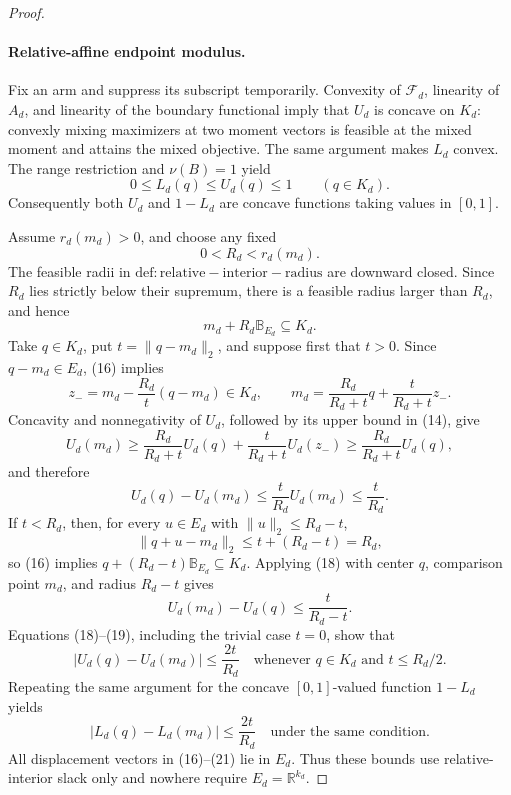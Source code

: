 \documentclass{article}
\begin{document}
\begin{proof}
\paragraph{Relative-affine endpoint modulus.}
Fix an arm and suppress its subscript temporarily.  Convexity of \(\mathcal F_d\), linearity of \(A_d\), and linearity of the boundary functional imply that \(U_d\) is concave on \(K_d\): convexly mixing maximizers at two moment vectors is feasible at the mixed moment and attains the mixed objective.  The same argument makes \(L_d\) convex.  The range restriction and \(\nu(B)=1\) yield
\[
 0\leq L_d(q)\leq U_d(q)\leq1
 \qquad(q\in K_d).                                         \tag{14}
\]
Consequently both \(U_d\) and \(1-L_d\) are concave functions taking values in \([0,1]\).

Assume \(r_d(m_d)>0\), and choose any fixed
\[
 0<R_d<r_d(m_d).                                            \tag{15}
\]
The feasible radii in \(\mathrm{def:relative-interior-radius}\) are downward closed.  Since \(R_d\) lies strictly below their supremum, there is a feasible radius larger than \(R_d\), and hence
\[
 m_d+R_d\mathbb B_{E_d}\subseteq K_d.                      \tag{16}
\]
Take \(q\in K_d\), put \(t=\|q-m_d\|_2\), and suppose first that \(t>0\).  Since \(q-m_d\in E_d\), (16) implies
\[
 z_-=m_d-\frac{R_d}{t}(q-m_d)\in K_d,
 \qquad
 m_d=\frac{R_d}{R_d+t}q+\frac{t}{R_d+t}z_-.                \tag{17}
\]
Concavity and nonnegativity of \(U_d\), followed by its upper bound in (14), give
\[
 U_d(m_d)
 \geq\frac{R_d}{R_d+t}U_d(q)
       +\frac{t}{R_d+t}U_d(z_-)
 \geq\frac{R_d}{R_d+t}U_d(q),
\]
and therefore
\[
 U_d(q)-U_d(m_d)
 \leq\frac{t}{R_d}U_d(m_d)
 \leq\frac{t}{R_d}.                                       \tag{18}
\]
If \(t<R_d\), then, for every \(u\in E_d\) with \(\|u\|_2\leq R_d-t\),
\[
 \|q+u-m_d\|_2\leq t+(R_d-t)=R_d,
\]
so (16) implies \(q+(R_d-t)\mathbb B_{E_d}\subseteq K_d\).  Applying (18) with center \(q\), comparison point \(m_d\), and radius \(R_d-t\) gives
\[
 U_d(m_d)-U_d(q)\leq\frac{t}{R_d-t}.                       \tag{19}
\]
Equations (18)--(19), including the trivial case \(t=0\), show that
\[
 |U_d(q)-U_d(m_d)|\leq\frac{2t}{R_d}
 \quad\text{whenever }q\in K_d\text{ and }t\leq R_d/2.    \tag{20}
\]
Repeating the same argument for the concave \([0,1]\)-valued function \(1-L_d\) yields
\[
 |L_d(q)-L_d(m_d)|\leq\frac{2t}{R_d}
 \quad\text{under the same condition}.                    \tag{21}
\]
All displacement vectors in (16)--(21) lie in \(E_d\).  Thus these bounds use relative-interior slack only and nowhere require \(E_d=\mathbb R^{k_d}\).


\end{proof}
\end{document}
